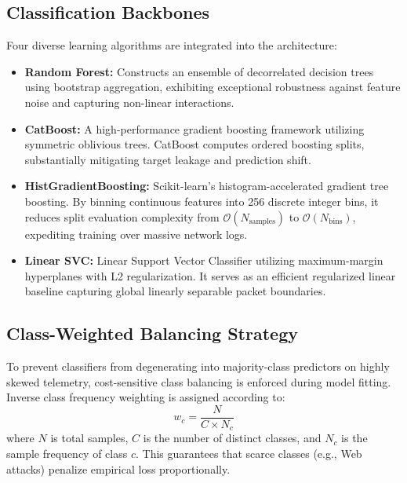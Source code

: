 \documentclass[conference]{IEEEtran}
\begin{document}
\subsection{Classification Backbones}
Four diverse learning algorithms are integrated into the architecture:
\begin{itemize}
    \item \textbf{Random Forest:} Constructs an ensemble of decorrelated decision trees using bootstrap aggregation, exhibiting exceptional robustness against feature noise and capturing non-linear interactions.
    \item \textbf{CatBoost:} A high-performance gradient boosting framework utilizing symmetric oblivious trees. CatBoost computes ordered boosting splits, substantially mitigating target leakage and prediction shift.
    \item \textbf{HistGradientBoosting:} Scikit-learn's histogram-accelerated gradient tree boosting. By binning continuous features into 256 discrete integer bins, it reduces split evaluation complexity from $\mathcal{O}(N_{\text{samples}})$ to $\mathcal{O}(N_{\text{bins}})$, expediting training over massive network logs.
    \item \textbf{Linear SVC:} Linear Support Vector Classifier utilizing maximum-margin hyperplanes with L2 regularization. It serves as an efficient regularized linear baseline capturing global linearly separable packet boundaries.
\end{itemize}

\subsection{Class-Weighted Balancing Strategy}
To prevent classifiers from degenerating into majority-class predictors on highly skewed telemetry, cost-sensitive class balancing is enforced during model fitting. Inverse class frequency weighting is assigned according to:
\begin{equation}
w_c = \frac{N}{C \times N_c}
\end{equation}
where $N$ is total samples, $C$ is the number of distinct classes, and $N_c$ is the sample frequency of class $c$. This guarantees that scarce classes (e.g., Web attacks) penalize empirical loss proportionally.
\end{document}
